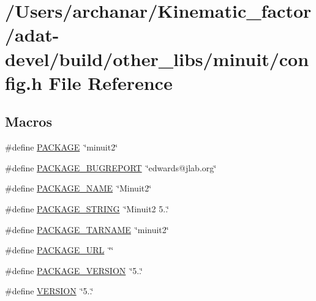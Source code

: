 \hypertarget{adat-devel_2build_2other__libs_2minuit_2config_8h}{}\section{/\+Users/archanar/\+Kinematic\+\_\+factor/adat-\/devel/build/other\+\_\+libs/minuit/config.h File Reference}
\label{adat-devel_2build_2other__libs_2minuit_2config_8h}
\subsection*{Macros}
\begin{DoxyCompactItemize}
\item 
\#define \mbox{\hyperlink{adat-devel_2build_2other__libs_2minuit_2config_8h_aca8570fb706c81df371b7f9bc454ae03}{P\+A\+C\+K\+A\+GE}}~\char`\"{}minuit2\char`\"{}
\item 
\#define \mbox{\hyperlink{adat-devel_2build_2other__libs_2minuit_2config_8h_a1d1d2d7f8d2f95b376954d649ab03233}{P\+A\+C\+K\+A\+G\+E\+\_\+\+B\+U\+G\+R\+E\+P\+O\+RT}}~\char`\"{}edwards@jlab.\+org\char`\"{}
\item 
\#define \mbox{\hyperlink{adat-devel_2build_2other__libs_2minuit_2config_8h_a1c0439e4355794c09b64274849eb0279}{P\+A\+C\+K\+A\+G\+E\+\_\+\+N\+A\+ME}}~\char`\"{}Minuit2\char`\"{}
\item 
\#define \mbox{\hyperlink{adat-devel_2build_2other__libs_2minuit_2config_8h_ac73e6f903c16eca7710f92e36e1c6fbf}{P\+A\+C\+K\+A\+G\+E\+\_\+\+S\+T\+R\+I\+NG}}~\char`\"{}Minuit2 5..\char`\"{}
\item 
\#define \mbox{\hyperlink{adat-devel_2build_2other__libs_2minuit_2config_8h_af415af6bfede0e8d5453708afe68651c}{P\+A\+C\+K\+A\+G\+E\+\_\+\+T\+A\+R\+N\+A\+ME}}~\char`\"{}minuit2\char`\"{}
\item 
\#define \mbox{\hyperlink{adat-devel_2build_2other__libs_2minuit_2config_8h_a5c93853116d5a50307b6744f147840aa}{P\+A\+C\+K\+A\+G\+E\+\_\+\+U\+RL}}~\char`\"{}\char`\"{}
\item 
\#define \mbox{\hyperlink{adat-devel_2build_2other__libs_2minuit_2config_8h_aa326a05d5e30f9e9a4bb0b4469d5d0c0}{P\+A\+C\+K\+A\+G\+E\+\_\+\+V\+E\+R\+S\+I\+ON}}~\char`\"{}5..\char`\"{}
\item 
\#define \mbox{\hyperlink{adat-devel_2build_2other__libs_2minuit_2config_8h_a1c6d5de492ac61ad29aec7aa9a436bbf}{V\+E\+R\+S\+I\+ON}}~\char`\"{}5..\char`\"{}
\end{DoxyCompactItemize}


